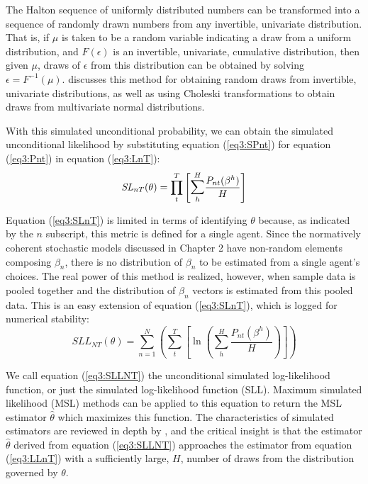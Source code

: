 \documentclass[../main.tex]{subfiles}
\begin{document}
The Halton sequence of uniformly distributed numbers can be transformed into a sequence of randomly drawn numbers from any invertible, univariate distribution.
That is, if $\mu$ is taken to be a random variable indicating a draw from a uniform distribution, and $F(\epsilon)$ is an invertible, univariate, cumulative distribution, then given $\mu$, draws of $\epsilon$ from this distribution can be obtained by solving $\epsilon = F^{-1}(\mu)$.
\textcite[236]{Train2002} discusses this method for obtaining random draws from invertible, univariate distributions, as well as using Choleski transformations to obtain draws from multivariate normal distributions.

With this simulated unconditional probability, we can obtain the simulated unconditional likelihood by substituting equation (\ref{eq3:SPnt}) for equation (\ref{eq3:Pnt}) in equation (\ref{eq3:LnT}):
\begin{equation}
	\label{eq3:SLnT}
	\mathit{SL}_{nT}(\theta) = \prod_t^T \left[ \mathlarger{\sum}_h^H \frac{ P_{nt}(\beta^h) }{H} \right]
\end{equation}

Equation (\ref{eq3:SLnT}) is limited in terms of identifying $\theta$ because, as indicated by the $n$ subscript, this metric is defined for a single agent.
Since the normatively coherent stochastic models discussed in Chapter 2 have non-random elements composing $\beta_n$, there is no distribution of $\beta_n$ to be estimated from a single agent's choices.
The real power of this method is realized, however, when sample data is pooled together and the distribution of $\beta_n$ vectors is estimated from this pooled data.
This is an easy extension of equation (\ref{eq3:SLnT}), which is logged for numerical stability:
\begin{equation}
	\label{eq3:SLLNT}
	\mathit{SLL}_{NT}(\theta) = \sum_{n=1}^N \left( \sum_t^T \left[ \ln\!\left( \sum_h^H \frac{ P_{nt}(\beta^h) }{H} \right) \right] \right)
\end{equation}

\noindent We call equation (\ref{eq3:SLLNT}) the unconditional simulated log-likelihood function, or just the simulated log-likelihood function (SLL).
Maximum simulated likelihood (MSL) methods can be applied to this equation to return the MSL estimator $\hat{\theta}$ which maximizes this function.
The characteristics of simulated estimators are reviewed in depth by \textcite[Chapter~10]{Train2002}, and the critical insight is that the estimator $\hat{\theta}$ derived from equation (\ref{eq3:SLLNT}) approaches the estimator from equation (\ref{eq3:LLnT}) with a sufficiently large, $H$, number of draws from the distribution governed by $\theta$.
\end{document}
